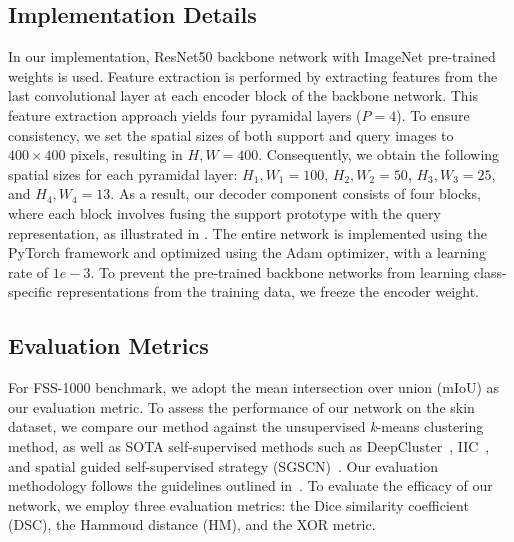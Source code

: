 \documentclass[runningheads]{llncs}
\begin{document}
\subsection{Implementation Details}
In our implementation, ResNet50 backbone network with ImageNet pre-trained weights is used. Feature extraction is performed by extracting features from the last convolutional layer at each encoder block of the backbone network. This feature extraction approach yields four pyramidal layers ($P=4$).
To ensure consistency, we set the spatial sizes of both support and query images to $400 \times 400$ pixels, resulting in $H,W = 400$. Consequently, we obtain the following spatial sizes for each pyramidal layer: $H_{1},W_{1} = 100$, $H_{2},W_{2} = 50$, $H_{3},W_{3} = 25$, and $H_{4},W_{4} = 13$. As a result, our decoder component consists of four blocks, where each block involves fusing the support prototype with the query representation, as illustrated in . The entire network is implemented using the PyTorch framework and optimized using the Adam optimizer, with a learning rate of $1e-3$. To prevent the pre-trained backbone networks from learning class-specific representations from the training data, we freeze the encoder weight.

\subsection{Evaluation Metrics}
For FSS-1000 benchmark, we adopt the mean intersection over union (mIoU) as our evaluation metric.
To assess the performance of our network on the skin dataset, we compare our method against the unsupervised \textit{k}-means clustering method, as well as SOTA self-supervised methods such as DeepCluster~\cite{caron2018deep}, IIC~\cite{ji2019invariant}, and spatial guided self-supervised strategy (SGSCN)~\cite{ahn2021spatial}. Our evaluation methodology follows the guidelines outlined in~\cite{ahn2021spatial}.
To evaluate the efficacy of our network, we employ three evaluation metrics: the Dice similarity coefficient (DSC), the Hammoud distance (HM), and the XOR metric.
\end{document}

